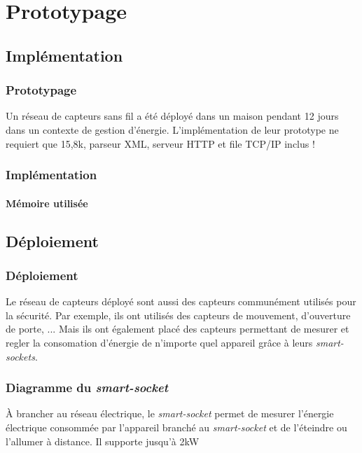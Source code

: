 \section{Prototypage}
\subsection{Implémentation}
\begin{frame}
 \frametitle{Prototypage}
 Un réseau de capteurs sans fil a été déployé dans un maison pendant 12 jours dans un contexte de gestion d'énergie.
 L'implémentation de leur prototype ne requiert que 15,8k, parseur XML, serveur HTTP et file TCP/IP inclus !
\end{frame}

\begin{frame}
 \frametitle{Implémentation}
 \framesubtitle{Mémoire utilisée}
\end{frame}


\subsection{Déploiement}
\begin{frame}
 \frametitle{Déploiement}
 Le réseau de capteurs déployé sont aussi des capteurs communément utilisés pour la sécurité.
 Par exemple, ils ont utilisés des capteurs de mouvement, d'ouverture de porte, ...
 Mais ils ont également placé des capteurs permettant de mesurer et regler la consomation d'énergie de n'importe quel appareil grâce à leurs \textit{smart-sockets}.
\end{frame}

\begin{frame}
 \frametitle{Diagramme du \textit{smart-socket}}
 À brancher au réseau électrique, le \textit{smart-socket} permet de mesurer l'énergie électrique consommée par l'appareil branché au \textit{smart-socket} et de l'éteindre ou l'allumer à distance.
 Il supporte jusqu'à 2kW\\
\end{frame}

